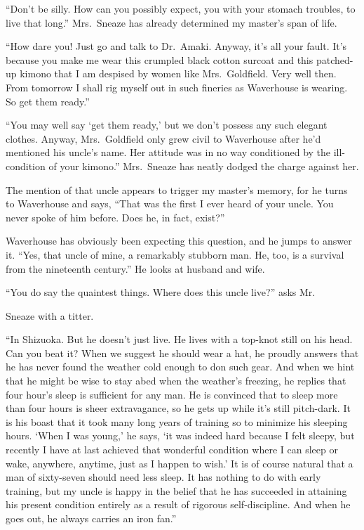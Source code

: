 \documentclass[12pt, openright]{book}
\begin{document}
``Don't be silly. How can you possibly expect, you with your stomach
troubles, to live that long.'' Mrs.~Sneaze has already determined my
master's span of life.

``How dare you! Just go and talk to Dr.~Amaki. Anyway, it's all your
fault. It's because you make me wear this crumpled black cotton surcoat
and this patched-up kimono that I am despised by women like
Mrs.~Goldfield. Very well then. From tomorrow I shall rig myself out in
such fineries as Waverhouse is wearing. So get them ready.''

``You may well say `get them ready,' but we don't possess any such
elegant clothes. Anyway, Mrs.~Goldfield only grew civil to Waverhouse
after he'd mentioned his uncle's name. Her attitude was in no way
conditioned by the ill-condition of your kimono.'' Mrs.~Sneaze has
neatly dodged the charge against her.

The mention of that uncle appears to trigger my master's memory, for he
turns to Waverhouse and says, ``That was the first I ever heard of your
uncle. You never spoke of him before. Does he, in fact, exist?''

Waverhouse has obviously been expecting this question, and he jumps to
answer it. ``Yes, that uncle of mine, a remarkably stubborn man. He,
too, is a survival from the nineteenth century.'' He looks at husband
and wife.

``You do say the quaintest things. Where does this uncle live?'' asks
Mr.

Sneaze with a titter.

``In Shizuoka. But he doesn't just live. He lives with a top-knot still
on his head. Can you beat it? When we suggest he should wear a hat, he
proudly answers that he has never found the weather cold enough to don
such gear. And when we hint that he might be wise to stay abed when the
weather's freezing, he replies that four hour's sleep is sufficient for
any man. He is convinced that to sleep more than four hours is sheer
extravagance, so he gets up while it's still pitch-dark. It is his boast
that it took many long years of training so to minimize his sleeping
hours. `When I was young,' he says, `it was indeed hard because I felt
sleepy, but recently I have at last achieved that wonderful condition
where I can sleep or wake, anywhere, anytime, just as I happen to wish.'
It is of course natural that a man of sixty-seven should need less
sleep. It has nothing to do with early training, but my uncle is happy
in the belief that he has succeeded in attaining his present condition
entirely as a result of rigorous self-discipline. And when he goes out,
he always carries an iron fan.''
\end{document}
